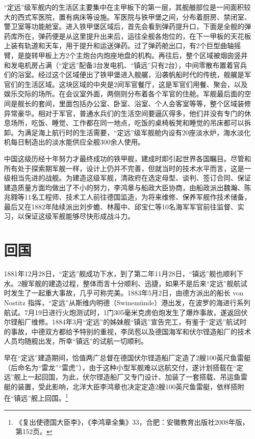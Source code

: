 \documentclass[12pt,UTF8]{ctexbook}
\begin{document}
“定远”级军舰内的生活区主要集中在主甲板下的第一层，其舰艏部位是一间面积较大的西式军医院，置有病床等设施。军医院与铁甲堡之间，分布着厨房、禁闭室、警卫室等功能舱室。进入铁甲堡区域后，首先会看到弹药提升口，下面是全舰的弹药库所在，弹药便是从这里提升出来后，运往全舰各炮位的，在下一甲板的天花板上装有轨道和天车，用于提升和运送弹药。过了弹药舱出口，有2个巨型曲轴摇臂，是旋转甲板上方2个主炮台内炮座地盘的机构。再往后，整个区域被烟囱竖井和发电机房占满（“定远”配备3台发电机、“镇远”只有2台），中间零散布置着官兵们的浴室。经过这个区域便出了铁甲堡进入舰艉，沿袭帆船时代的传统，舰艉是军官们的生活区域。这块区域的中央是2间军官餐厅，这是军官们用餐、聚会，以及娱乐交际的场所。在会议室外面，两侧则分布着各个军官的住舱。军舰最后面的空间是舰长的套间，里面包括办公室、卧室、浴室、个人会客室等等，整个区域装修异常豪华。相对于军官，普通水兵们的生活空间要逼仄得多，他们并没有专门的休息场所，吃饭、睡觉、工作都在同一地点，吃饭的桌椅板凳和睡觉的吊床都可以拆卸。为满足海上航行时的生活需要，“定远”级军舰舱内设有20座淡水炉，海水淡化机每日制造出的淡水能供应全舰300余人使用。

中国这级历经十年努力才最终成功的铁甲舰，建成时即引起世界各国瞩目。尽管和所有处于探索期军舰一样，设计上仍并不完善，但就当时的技术水平而言，这是一级相当先进的战舰。为建造这级军舰，清政府在选定母型、谈判、签订合同、保证建造质量方面均做出了不小的努力，李鸿章与船政大臣协商，由船政派出魏瀚、陈兆翱等11名工程师、技术工人前往德国监造，为将来维修、保养军舰作技术储备，最后又在1882年陆续派出刘步蟾、林履中、邱宝仁等10名海军军官前往监督、实习，以保证这级军舰能够尽快形成战斗力。

\section{回国}

1881年12月28日，“定远”舰成功下水，到了第二年11月28日，“镇远”舰也顺利下水。2艘军舰的建造过程，整体而言十分顺利、迅捷，如果不是后来“定远”舰航试时发生了一起重大事故，几乎可称完美。1883年5月2日，由德方派出的船长 von Nostitz 指挥，“定远”从斯维内明德（Swinemünde）港出发，在波罗的海进行系列航试。7月19日进行火炮测试时，1门305毫米克虏伯炮发生了爆炸事故，遂返回伏尔铿船厂维修。1884年3月“定远”的姊妹舰“镇远”宣告完工，有鉴于“定远”航试时的事故，中德双方都给予特别的重视，李凤苞以及德国海军和伏尔铿造船厂的技术人员均随舰出发，所幸“镇远”的试航一切顺利。

早在“定远”建造期间，恰值两广总督在德国伏尔铿造船厂定造了2艘100英尺鱼雷艇（后命名为“雷龙”“雷虎”），由于这种小型军舰难以远航交付，遂计划搭载在“定远”舰上一起回国，为此，伏尔铿造船厂又专门设计、加装了一套搭载、吊运鱼雷艇的装置，受此影响，北洋大臣李鸿章也决定定造2艘100英尺鱼雷艇，依样搭附在“镇远”舰上回国。\footnote{《复出使德国大臣李》，《李鸿章全集》33，合肥：安徽教育出版社2008年版，第152页。}
\end{document}
